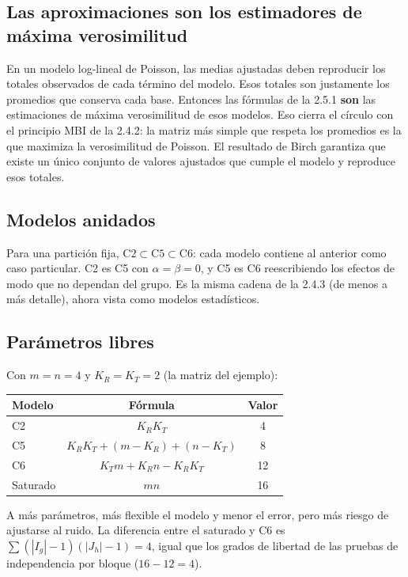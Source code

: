 \documentclass[11pt,a4paper]{article}
\begin{document}
\subsection{Las aproximaciones son los estimadores de máxima verosimilitud}

En un modelo log-lineal de Poisson, las medias ajustadas deben reproducir los
totales observados de cada término del modelo. Esos totales son justamente los
promedios que conserva cada base. Entonces las fórmulas de la 2.5.1
\textbf{son} las estimaciones de máxima verosimilitud de esos modelos. Eso cierra
el círculo con el principio MBI de la 2.4.2: la matriz más simple que respeta los
promedios es la que maximiza la verosimilitud de Poisson. El resultado de Birch
garantiza que existe un único conjunto de valores ajustados que cumple el modelo y
reproduce esos totales.

\subsection{Modelos anidados}

Para una partición fija, $\mathrm{C2}\subset\mathrm{C5}\subset\mathrm{C6}$: cada
modelo contiene al anterior como caso particular. C2 es C5 con $\alpha=\beta=0$, y
C5 es C6 reescribiendo los efectos de modo que no dependan del grupo. Es la misma
cadena de la 2.4.3 (de menos a más detalle), ahora vista como modelos
estadísticos.

\subsection{Parámetros libres}

Con $m=n=4$ y $K_R=K_T=2$ (la matriz del ejemplo):
\begin{center}
\begin{tabular}{lcc}
\toprule
Modelo & Fórmula & Valor \\
\midrule
C2 & $K_RK_T$ & 4 \\
C5 & $K_RK_T+(m-K_R)+(n-K_T)$ & 8 \\
C6 & $K_Tm+K_Rn-K_RK_T$ & 12 \\
Saturado & $mn$ & 16 \\
\bottomrule
\end{tabular}
\end{center}
A más parámetros, más flexible el modelo y menor el error, pero más riesgo de
ajustarse al ruido. La diferencia entre el saturado y C6 es
$\sum(|I_g|-1)(|J_h|-1)=4$, igual que los grados de libertad de las pruebas de
independencia por bloque ($16-12=4$).
\end{document}
